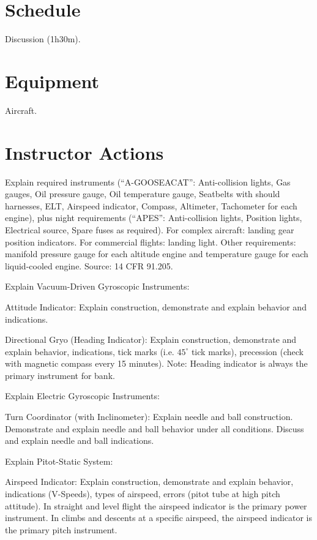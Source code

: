 \documentclass[twoside,openright]{report}
\begin{document}
\section{Schedule}

Discussion (1h30m).

\section{Equipment}

Aircraft.

\section{Instructor Actions}

Explain required instruments (``A-GOOSEACAT'': Anti-collision lights, Gas
gauges, Oil pressure gauge, Oil temperature gauge, Seatbelts with should
harnesses, ELT, Airspeed indicator, Compass, Altimeter, Tachometer for each
engine), plus night requirements (``APES'': Anti-collision lights, Position
lights, Electrical source, Spare fuses as required). For complex aircraft:
landing gear position indicators. For commercial flights: landing light. Other
requirements: manifold pressure gauge for each altitude engine and temperature
gauge for each liquid-cooled engine. Source: 14 CFR 91.205.

Explain Vacuum-Driven Gyroscopic Instruments:

Attitude Indicator: Explain construction, demonstrate and explain behavior and indications.

Directional Gryo (Heading Indicator): Explain construction, demonstrate and
explain behavior, indications, tick marks (i.e. $45^{\circ}$ tick marks),
precession (check with magnetic compass every 15 minutes). Note: Heading
indicator is always the primary instrument for bank.

Explain Electric Gyroscopic Instruments:

Turn Coordinator (with Inclinometer): Explain needle and ball construction.
Demonstrate and explain needle and ball behavior under all conditions. Discuss
and explain needle and ball indications.

Explain Pitot-Static System:

Airspeed Indicator: Explain construction, demonstrate and explain behavior,
indications (V-Speeds), types of airspeed, errors (pitot tube at high pitch
attitude). In straight and level flight the airspeed indicator is the primary
power instrument. In climbs and descents at a specific airspeed, the airspeed
indicator is the primary pitch instrument.
\end{document}
